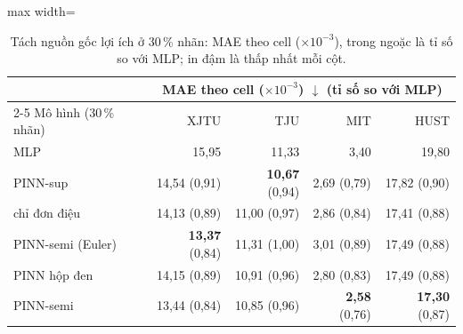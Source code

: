 \begin{table}[!htbp]\centering\small
\caption[Tách nguồn gốc lợi ích ở 30\,\% nhãn]{Tách nguồn gốc lợi ích ở 30\,\% nhãn: MAE theo cell (×$10^{-3}$), trong ngoặc là tỉ số so với MLP; in đậm là thấp nhất mỗi cột.}\label{tab:source}
\begin{adjustbox}{max width=\textwidth}\begin{tabular}{lrrrr}\toprule
 & \multicolumn{4}{c}{MAE theo cell ($\times10^{-3}$) $\downarrow$ (tỉ số so với MLP)} \\\cmidrule(lr){2-5}
Mô hình (30\,\% nhãn) & XJTU & TJU & MIT & HUST \\\midrule
MLP & 15{,}95 & 11{,}33 & 3{,}40 & 19{,}80 \\
PINN-sup & 14{,}54 (0{,}91) & \textbf{10{,}67} (0{,}94) & 2{,}69 (0{,}79) & 17{,}82 (0{,}90) \\
chỉ đơn điệu & 14{,}13 (0{,}89) & 11{,}00 (0{,}97) & 2{,}86 (0{,}84) & 17{,}41 (0{,}88) \\
PINN-semi (Euler) & \textbf{13{,}37} (0{,}84) & 11{,}31 (1{,}00) & 3{,}01 (0{,}89) & 17{,}49 (0{,}88) \\
PINN hộp đen & 14{,}15 (0{,}89) & 10{,}91 (0{,}96) & 2{,}80 (0{,}83) & 17{,}49 (0{,}88) \\
PINN-semi & 13{,}44 (0{,}84) & 10{,}85 (0{,}96) & \textbf{2{,}58} (0{,}76) & \textbf{17{,}30} (0{,}87) \\
\bottomrule\end{tabular}\end{adjustbox}\end{table}
